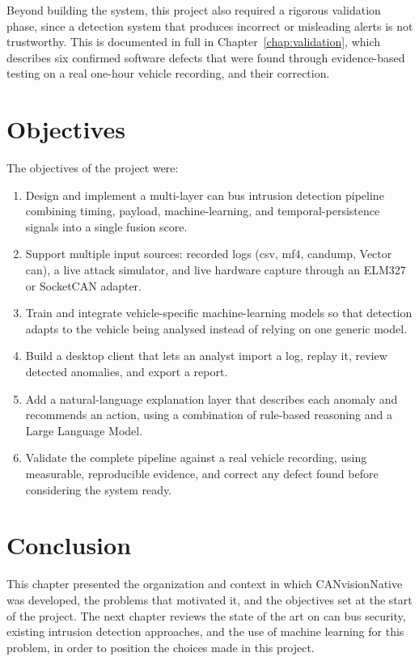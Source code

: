 Beyond building the system, this project also required a rigorous validation phase, since a detection system that produces incorrect or misleading alerts is not trustworthy. This is documented in full in Chapter~\ref{chap:validation}, which describes six confirmed software defects that were found through evidence-based testing on a real one-hour vehicle recording, and their correction.

\section{Objectives}

The objectives of the project were:

\begin{enumerate}
    \item Design and implement a multi-layer \gls{can} bus intrusion detection pipeline combining timing, payload, machine-learning, and temporal-persistence signals into a single fusion score.
    \item Support multiple input sources: recorded logs (\gls{csv}, \gls{mf4}, candump, Vector \gls{can}), a live attack simulator, and live hardware capture through an ELM327 or SocketCAN adapter.
    \item Train and integrate vehicle-specific machine-learning models so that detection adapts to the vehicle being analysed instead of relying on one generic model.
    \item Build a desktop client that lets an analyst import a log, replay it, review detected anomalies, and export a report.
    \item Add a natural-language explanation layer that describes each anomaly and recommends an action, using a combination of rule-based reasoning and a Large Language Model.
    \item Validate the complete pipeline against a real vehicle recording, using measurable, reproducible evidence, and correct any defect found before considering the system ready.
\end{enumerate}

\section{Conclusion}

This chapter presented the organization and context in which CANvisionNative was developed, the problems that motivated it, and the objectives set at the start of the project. The next chapter reviews the state of the art on \gls{can} bus security, existing intrusion detection approaches, and the use of machine learning for this problem, in order to position the choices made in this project.
